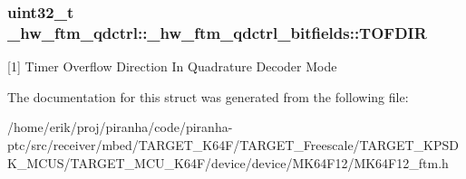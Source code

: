 \subsubsection[{\texorpdfstring{T\+O\+F\+D\+IR}{TOFDIR}}]{\setlength{\rightskip}{0pt plus 5cm}uint32\+\_\+t \+\_\+hw\+\_\+ftm\+\_\+qdctrl\+::\+\_\+hw\+\_\+ftm\+\_\+qdctrl\+\_\+bitfields\+::\+T\+O\+F\+D\+IR}\hypertarget{struct__hw__ftm__qdctrl_1_1__hw__ftm__qdctrl__bitfields_ab928edd181bc15e82db9bf887c773d3b}{}\label{struct__hw__ftm__qdctrl_1_1__hw__ftm__qdctrl__bitfields_ab928edd181bc15e82db9bf887c773d3b}
\mbox{[}1\mbox{]} Timer Overflow Direction In Quadrature Decoder Mode 

The documentation for this struct was generated from the following file\+:\begin{DoxyCompactItemize}
\item 
/home/erik/proj/piranha/code/piranha-\/ptc/src/receiver/mbed/\+T\+A\+R\+G\+E\+T\+\_\+\+K64\+F/\+T\+A\+R\+G\+E\+T\+\_\+\+Freescale/\+T\+A\+R\+G\+E\+T\+\_\+\+K\+P\+S\+D\+K\+\_\+\+M\+C\+U\+S/\+T\+A\+R\+G\+E\+T\+\_\+\+M\+C\+U\+\_\+\+K64\+F/device/device/\+M\+K64\+F12/M\+K64\+F12\+\_\+ftm.\+h\end{DoxyCompactItemize}
